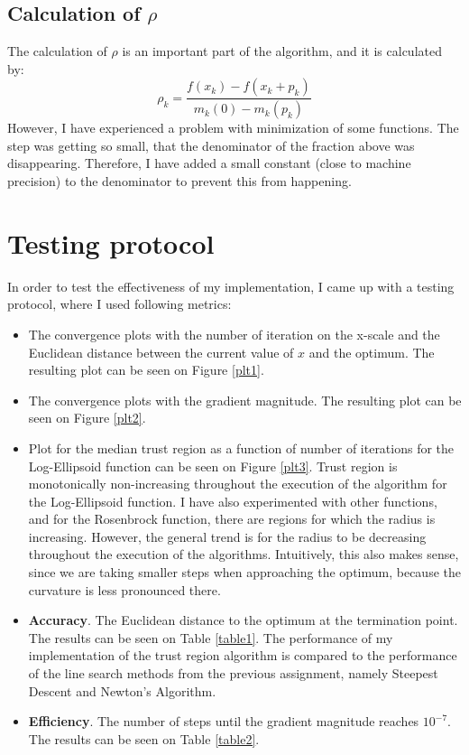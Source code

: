 \documentclass[a4paper]{article}
\begin{document}
\subsection{Calculation of $\rho$}
The calculation of $\rho$ is an important part of the algorithm, and it is
calculated by:
\[
\rho_{k}=\frac{f\left(x_{k}\right)-f\left(x_{k}+p_{k}\right)}{m_{k}(0)-m_{k}\left(p_{k}\right)}
\]
However, I have experienced a problem with minimization of some functions.
The step was getting so small, that the denominator of the fraction above
was disappearing. Therefore, I have added a small constant (close to machine
precision) to the denominator to prevent this from happening.


\section{Testing protocol}
In order to test the effectiveness of my implementation, I came up with a
testing protocol, where I used following metrics:
\begin{itemize}
\item The convergence plots with the number of iteration on the x-scale and the
  Euclidean distance between the current value of $x$ and the
  optimum. The resulting plot can be seen on Figure \ref{plt1}.
\item The convergence plots with the gradient magnitude.
  The resulting plot can be seen on Figure \ref{plt2}. 
\item Plot for the median trust region as a function of number of iterations for
  the Log-Ellipsoid function can be seen on Figure \ref{plt3}. Trust region is
  monotonically non-increasing throughout the execution of the algorithm for the
  Log-Ellipsoid function. I have also experimented with other functions, and for
  the Rosenbrock function, there are regions for which the radius is increasing.
  However, the general trend is for the radius to be decreasing throughout the
  execution of the algorithms. Intuitively, this also makes sense, since we are
  taking smaller steps when approaching the optimum, because the curvature is
  less pronounced there.
\item \textbf{Accuracy}. The Euclidean distance to the optimum at the
  termination point. The results can be seen on Table \ref{table1}.
  The performance of my implementation of the trust
  region algorithm is compared to the performance of the line search methods
  from the previous assignment, namely Steepest Descent and Newton's Algorithm.
\item \textbf{Efficiency}. The number of steps until the gradient
  magnitude reaches $10^{-7}$. The results can be seen on Table \ref{table2}.
\end{itemize}
\end{document}
